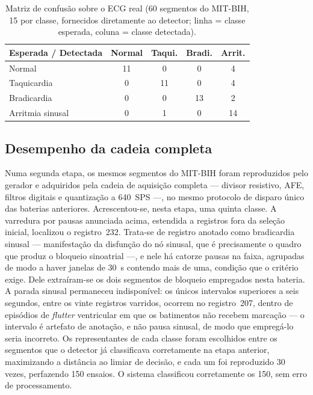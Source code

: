\begin{table}[htb]
\centering
\caption{Matriz de confusão sobre o \acs{ECG} real (60 segmentos do MIT-BIH, 15 por classe, fornecidos diretamente ao detector; linha = classe esperada, coluna = classe detectada).}
\label{tab:matrizMITBIH}
\begin{tabular}{l c c c c}
\hline
\textbf{Esperada / Detectada} & \textbf{Normal} & \textbf{Taqui.} & \textbf{Bradi.} & \textbf{Arrit.} \\
\hline
Normal            & 11 & 0  & 0  & 4  \\
Taquicardia       & 0  & 11 & 0  & 4  \\
Bradicardia       & 0  & 0  & 13 & 2  \\
Arritmia sinusal  & 0  & 1  & 0  & 14 \\
\hline
\end{tabular}
\end{table}

\subsection{Desempenho da cadeia completa}
\label{sec:resMitbihCadeia}

Numa segunda etapa, os mesmos segmentos do MIT-BIH foram reproduzidos pelo gerador e adquiridos pela cadeia de aquisição completa — divisor resistivo, \acs{AFE}, filtros digitais e quantização a 640~SPS —, no mesmo protocolo de disparo único das baterias anteriores. Acrescentou-se, nesta etapa, uma quinta classe. A varredura por pausas anunciada acima, estendida a registros fora da seleção inicial, localizou o registro~232. Trata-se de registro anotado como bradicardia sinusal --- manifestação da disfunção do nó sinusal, que é precisamente o quadro que produz o bloqueio sinoatrial ---, e nele há catorze pausas na faixa, agrupadas de modo a haver janelas de 30~s contendo mais de uma, condição que o critério exige. Dele extraíram-se os dois segmentos de bloqueio empregados nesta bateria. A parada sinusal permaneceu indisponível: os únicos intervalos superiores a seis segundos, entre os vinte registros varridos, ocorrem no registro~207, dentro de episódios de \textit{flutter} ventricular em que os batimentos não recebem marcação --- o intervalo é artefato de anotação, e não pausa sinusal, de modo que empregá-lo seria incorreto. Os representantes de cada classe foram escolhidos entre os segmentos que o detector já classificava corretamente na etapa anterior, maximizando a distância ao limiar de decisão, e cada um foi reproduzido 30 vezes, perfazendo 150 ensaios. O sistema classificou corretamente os 150, sem erro de processamento.

